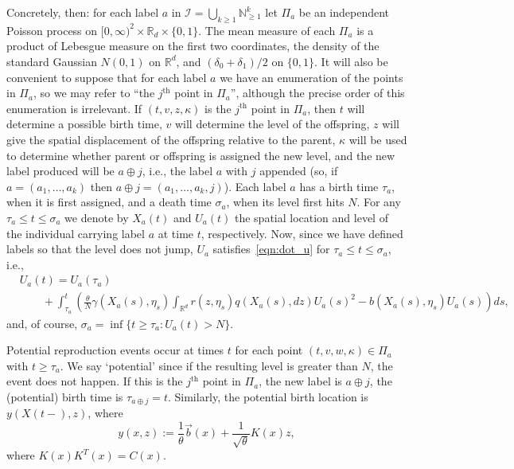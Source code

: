 \documentclass[12pt]{article}
\newcommand{\IR}{\mathbb R}
\newcommand{\IN}{\mathbb N}
\newcommand{\meanq}{\vec b}    %
\newcommand{\covq}{C}     %
\newcommand{\labelspace}{\mathcal{I}} %
\newcommand{\concat}{\oplus}   %
\begin{document}
Concretely, then: for each label $a$ in
$\labelspace = \bigcup_{k \ge 1} \IN_{\ge 1}^k$
let $\Pi_a$ be an independent Poisson process on $[0, \infty)^2 \times \IR_d \times \{0,1\}$.
The mean measure of each $\Pi_a$ is a product of Lebesgue measure on the first two coordinates,
the density of the standard Gaussian $N(0,1)$ on $\IR^d$, and $(\delta_0 + \delta_1)/2$ on $\{0, 1\}$.
It will also be convenient
to suppose that for each label $a$ we have an enumeration of the points in $\Pi_a$,
so we may refer to ``the $j^\text{th}$ point in $\Pi_a$'',
although the precise order of this enumeration is irrelevant.
If $(t, v, z, \kappa)$ is the $j^\text{th}$ point in $\Pi_a$,
then $t$ will determine a possible birth time,
$v$ will determine the level of the offspring,
$z$ will give the spatial displacement of the offspring relative to the parent,
$\kappa$ will be used to determine whether parent or offspring is assigned the new level,
and the new label produced will be $a \concat j$,
i.e., the label $a$ with $j$ appended
(so, if $a = (a_1, \ldots, a_k)$ then $a \concat j = (a_1, \ldots, a_k, j)$).
Each label $a$ has a birth time $\tau_a$,
when it is first assigned,
and a death time $\sigma_a$, when its level first hits $N$.
For any $\tau_a \le t \le \sigma_a$ we denote by $X_a(t)$ and $U_a(t)$ the spatial location and level
of the individual carrying label $a$ at time $t$, respectively.
Now, since we have defined labels so that the level does not jump,
$U_a$ satisfies~\eqref{eqn:dot_u} for $\tau_a \le t \le \sigma_a$, i.e.,
\begin{equation} \label{eqn:U_line_of_descent}
    \begin{split}
& U_a(t)
    =
    U_a(\tau_a) \\
&\qquad {}   
    + \int_{\tau_a}^{t}
    \left(
        \frac{\theta}{N} \gamma(X_a(s),\eta_s)
        \int_{\IR^d} r(z,\eta_s) q(X_a(s),dz) U_a(s)^2
        -
        b(X_a(s),\eta_s) U_a(s)
    \right)
    ds ,
\end{split}
\end{equation}
and, of course, $\sigma_a = \inf\{t \ge \tau_a : U_a(t) > N\}$.

Potential reproduction events occur at times $t$
for each point $(t, v, w, \kappa) \in \Pi_a$ with $t \ge \tau_a$.
We say `potential' since if the resulting level is greater than $N$,
the event does not happen.
If this is the $j^\text{th}$ point in $\Pi_a$,
the new label is $a \concat j$, the (potential) birth time is $\tau_{a \concat j} = t$.
Similarly, the potential birth location is $y(X(t-), z)$, where
$$
    y(x, z)
    :=
    \frac{1}{\theta}\meanq(x)
    +
    \frac{1}{\sqrt{\theta}}K(x) z,
$$
where $K(x)K^{T}(x) = \covq(x)$.
\end{document}
